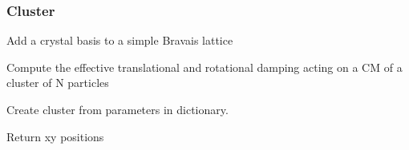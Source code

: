 \documentclass[letterpaper,10pt,english]{sphinxmanual}
\begin{document}
\sphinxstepscope


\subsubsection{Cluster}
\label{\detokenize{tool_create_cluster:module-tool_create_cluster}}\label{\detokenize{tool_create_cluster:cluster}}\label{\detokenize{tool_create_cluster::doc}}

\begin{fulllineitems}
\label{\detokenize{tool_create_cluster:tool_create_cluster.add_basis}}
\pysigstartsignatures
{}
\pysigstopsignatures
\sphinxAtStartPar
Add a crystal basis to a simple Bravais lattice

\end{fulllineitems}


\begin{fulllineitems}
\label{\detokenize{tool_create_cluster:tool_create_cluster.calc_cluster_langevin}}
\pysigstartsignatures
{}
\pysigstopsignatures
\sphinxAtStartPar
Compute the effective translational and rotational damping acting on a CM of a cluster of N particles

\end{fulllineitems}


\begin{fulllineitems}
\label{\detokenize{tool_create_cluster:tool_create_cluster.cluster_from_params}}
\pysigstartsignatures
{}
\pysigstopsignatures
\sphinxAtStartPar
Create cluster from parameters in dictionary.

\sphinxAtStartPar
Return xy positions

\end{fulllineitems}
\end{document}
